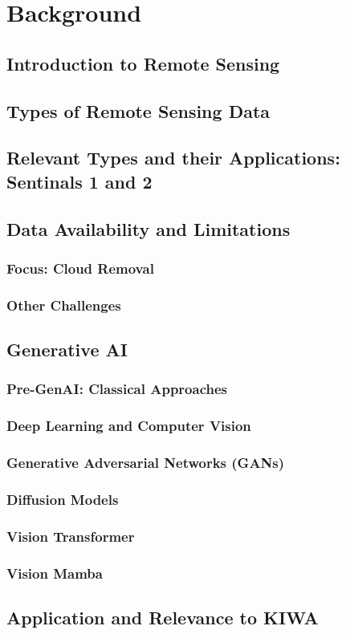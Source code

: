 \chapter{Background}

\section{Introduction to Remote Sensing}

\section{Types of Remote Sensing Data}

\section{Relevant Types and their Applications: Sentinals 1 and 2}

\section{Data Availability and Limitations}

\subsection{Focus: Cloud Removal}

\subsection{Other Challenges}

\section{Generative AI}
\subsection{Pre-GenAI: Classical Approaches}
\subsection{Deep Learning and Computer Vision}
\subsection{Generative Adversarial Networks (GANs)}
\subsection{Diffusion Models}
\subsection{Vision Transformer}
\subsection{Vision Mamba}

\section{Application and Relevance to KIWA}


